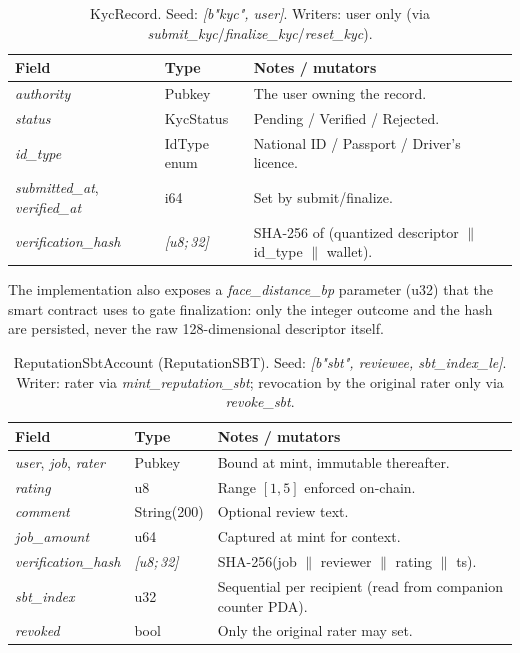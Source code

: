 \begin{table}[H]
\centering
\caption{KycRecord. Seed: \emph{[b"kyc", user]}. Writers: user only (via \emph{submit\_kyc}/\emph{finalize\_kyc}/\emph{reset\_kyc}).}
\label{table:pda_kyc}
\small
\begin{tabular}{|l|l|p{6.5cm}|}
\hline
\textbf{Field} & \textbf{Type} & \textbf{Notes / mutators} \\ \hline
\emph{authority} & Pubkey & The user owning the record. \\ \hline
\emph{status} & KycStatus & Pending / Verified / Rejected. \\ \hline
\emph{id\_type} & IdType enum & National ID / Passport / Driver's licence. \\ \hline
\emph{submitted\_at}, \emph{verified\_at} & i64 & Set by submit/finalize. \\ \hline
\emph{verification\_hash} & \emph{[u8;\,32]} & SHA-256 of (quantized descriptor $\|$ id\_type $\|$ wallet). \\ \hline
\end{tabular}
\end{table}

\noindent The implementation also exposes a \emph{face\_distance\_bp} parameter (u32) that the smart contract uses to gate finalization: only the integer outcome and the hash are persisted, never the raw 128-dimensional descriptor itself.

\begin{table}[H]
\centering
\caption{ReputationSbtAccount (ReputationSBT). Seed: \emph{[b"sbt", reviewee, sbt\_index\_le]}. Writer: rater via \emph{mint\_reputation\_sbt}; revocation by the original rater only via \emph{revoke\_sbt}.}
\label{table:pda_sbt}
\small
\begin{tabular}{|l|l|p{6.5cm}|}
\hline
\textbf{Field} & \textbf{Type} & \textbf{Notes / mutators} \\ \hline
\emph{user}, \emph{job}, \emph{rater} & Pubkey & Bound at mint, immutable thereafter. \\ \hline
\emph{rating} & u8 & Range $[1,5]$ enforced on-chain. \\ \hline
\emph{comment} & String(200) & Optional review text. \\ \hline
\emph{job\_amount} & u64 & Captured at mint for context. \\ \hline
\emph{verification\_hash} & \emph{[u8;\,32]} & SHA-256(job $\|$ reviewer $\|$ rating $\|$ ts). \\ \hline
\emph{sbt\_index} & u32 & Sequential per recipient (read from companion counter PDA). \\ \hline
\emph{revoked} & bool & Only the original rater may set. \\ \hline
\end{tabular}
\end{table}

